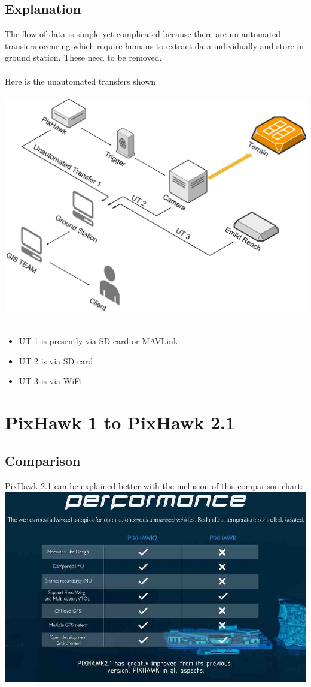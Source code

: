 \documentclass[12pt]{report}
\begin{document}
\section{Explanation}
The flow of data is simple yet complicated because there are un automated transfers occuring which require humans to extract data individually and store in ground station. These need to be removed.
\\
\\
Here is the unautomated transfers shown
\\
\\
\includegraphics[width=\linewidth]{Present_Unautomated_System.jpg}
\\
\\
\begin{itemize}
\item UT 1 is presently via SD card or MAVLink
\item UT 2 is via SD card
\item UT 3 is via WiFi
\end{itemize}

\chapter{PixHawk 1 to PixHawk 2.1}
\section{Comparison}
PixHawk 2.1 can be explained better with the inclusion of this comparison chart:- 
\includegraphics[width=\linewidth]{pixhawk2vs1.jpg}
\end{document}
